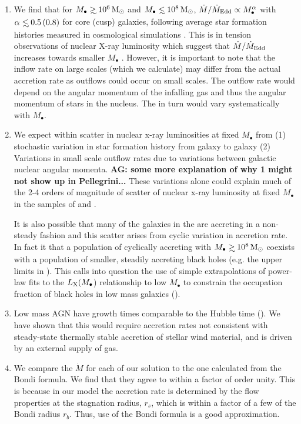 \documentclass[usenatbib,fleqn]{mn2e}
\newcommand{\Mdot}{\dot{M}}
\newcommand{\eddr}{\dot{M}/\dot{M}_{\rm Edd}}
\newcommand\lsim{\mathrel{\rlap{\lower4pt\hbox{\hskip1pt$\sim$}}
    \raise1pt\hbox{$<$}}}
\newcommand\gsim{\mathrel{\rlap{\lower4pt\hbox{\hskip1pt$\sim$}}
    \raise1pt\hbox{$>$}}}
\newcommand{\rs}{r_s}
\newcommand{\rb}{r_b}
\newcommand{\Mbh}[1][]{M_{\bullet#1}}
\begin{document}
  \begin{enumerate}
  \item We find that for $\Mbh\gsim 10^6 \Msun$ and $\Mbh\lsim 10^8
    \Msun$, $\eddr \propto \Mbh^{\alpha}$ with $\alpha\lsim
    0.5 \, (0.8)$ for core (cusp) galaxies, 
    following average star formation histories measured in
    cosmological simulations \citep{MosterNaab+:2013a}. This is in
    tension observations of nuclear X-ray luminosity which suggest
    that $\eddr$ increases towards smaller $\Mbh$
    \citep{Miller+15}. However, it is important to note that the
    inflow rate on large scales (which we calculate) may differ from
    the actual accretion rate as outflows could occur on small
    scales. The outflow rate would depend on the angular momentum of
    the infalling gas and thus the angular momentum of stars in the
    nucleus. The in turn would vary systematically with $\Mbh$.
  \item We expect within scatter in nuclear x-ray luminosities at
    fixed $\Mbh$ from (1) stochastic variation in star formation
    history from galaxy to galaxy (2) Variations in small scale outflow
    rates due to variations between galactic nuclear angular
    momenta. {\bf AG: some more explanation of why 1 might not show up
    in Pellegrini...}
    These variations alone could explain much of the 2-4 orders of
    magnitude of scatter of nuclear x-ray luminosity at fixed $\Mbh$ 
    in the samples of \citet{Miller+15} and \citet{Pellegrini:2010a}.
    
    It is also possible that many of the galaxies in the
    \citet{Miller+15} are accreting in a non-steady fashion and this
    scatter arises from cyclic variation in accretion rate. In fact it
    that a population of cyclically accreting with $\Mbh\gsim 10^{8}
    \Msun$ coexists with a population of smaller, steadily accreting
    black holes (e.g. the upper limits in \citet{Miller+15}).  This
    calls into question the use of simple extrapolations of power-law
    fits to the $L_{\rm X}(M_{\bullet}$) relationship to low $M_{\bullet}$
    to constrain the occupation fraction of black holes in low mass
    galaxies (\citealt{Miller+15}).
  \item Low mass AGN have growth times comparable to the Hubble time
    (\citet{Heckman+04}). We have shown that this would require accretion
    rates not consistent with steady-state thermally stable accretion
    of stellar wind material, and is driven by an external supply of gas.
  \item We compare the $\Mdot$ for each of our solution to the one
    calculated from the Bondi formula. We find that they agree to
    within a factor of order unity. This is because in our model the
    accretion rate is determined by the flow properties at the
    stagnation radius, $\rs$, which is within a factor of a few of the
    Bondi radius $\rb$. Thus, use of the Bondi formula is a
    good approximation.
    \end{enumerate}
   
\end{document}
